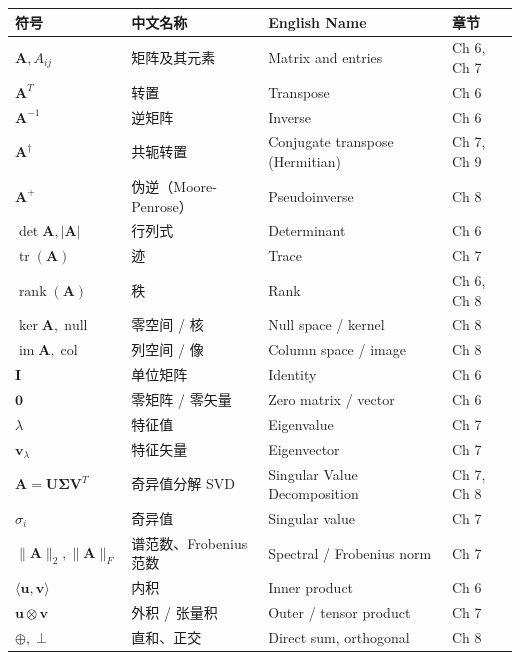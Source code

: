 \begin{center}
\renewcommand{\arraystretch}{1.25}
\begin{tabular}{@{}llll@{}}
\toprule
\textbf{符号} & \textbf{中文名称} & \textbf{English Name} & \textbf{章节} \\
\midrule
$\mathbf{A}, A_{ij}$ & 矩阵及其元素 & Matrix and entries & Ch 6, Ch 7 \\
$\mathbf{A}^T$ & 转置 & Transpose & Ch 6 \\
$\mathbf{A}^{-1}$ & 逆矩阵 & Inverse & Ch 6 \\
$\mathbf{A}^\dagger$ & 共轭转置 & Conjugate transpose (Hermitian) & Ch 7, Ch 9 \\
$\mathbf{A}^+$ & 伪逆（Moore-Penrose）& Pseudoinverse & Ch 8 \\
$\det \mathbf{A}, |\mathbf{A}|$ & 行列式 & Determinant & Ch 6 \\
$\operatorname{tr}(\mathbf{A})$ & 迹 & Trace & Ch 7 \\
$\operatorname{rank}(\mathbf{A})$ & 秩 & Rank & Ch 6, Ch 8 \\
$\ker \mathbf{A}, \operatorname{null}$ & 零空间 / 核 & Null space / kernel & Ch 8 \\
$\operatorname{im} \mathbf{A}, \operatorname{col}$ & 列空间 / 像 & Column space / image & Ch 8 \\
$\mathbf{I}$ & 单位矩阵 & Identity & Ch 6 \\
$\mathbf{0}$ & 零矩阵 / 零矢量 & Zero matrix / vector & Ch 6 \\
$\lambda$ & 特征值 & Eigenvalue & Ch 7 \\
$\mathbf{v}_\lambda$ & 特征矢量 & Eigenvector & Ch 7 \\
$\mathbf{A} = \mathbf{U} \boldsymbol{\Sigma} \mathbf{V}^T$ & 奇异值分解 SVD & Singular Value Decomposition & Ch 7, Ch 8 \\
$\sigma_i$ & 奇异值 & Singular value & Ch 7 \\
$\|\mathbf{A}\|_2, \|\mathbf{A}\|_F$ & 谱范数、Frobenius 范数 & Spectral / Frobenius norm & Ch 7 \\
$\langle \mathbf{u}, \mathbf{v} \rangle$ & 内积 & Inner product & Ch 6 \\
$\mathbf{u} \otimes \mathbf{v}$ & 外积 / 张量积 & Outer / tensor product & Ch 7 \\
$\oplus, \perp$ & 直和、正交 & Direct sum, orthogonal & Ch 8 \\
\bottomrule
\end{tabular}
\end{center}

